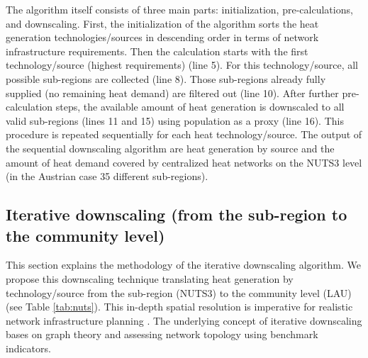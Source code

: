\newpage
The algorithm itself consists of three main parts: initialization, pre-calculations, and downscaling. First, the initialization of the algorithm sorts the heat generation technologies/sources in descending order in terms of network infrastructure requirements. Then the calculation starts with the first technology/source (highest requirements) (line 5). For this technology/source, all possible sub-regions are collected (line 8). Those sub-regions already fully supplied (no remaining heat demand) are filtered out (line 10). After further pre-calculation steps, the available amount of heat generation is downscaled to all valid sub-regions (lines 11 and 15) using population as a proxy (line 16). This procedure is repeated sequentially for each heat technology/source. The output of the sequential downscaling algorithm are heat generation by source and the amount of heat demand covered by centralized heat networks on the NUTS3 level (in the Austrian case 35 different sub-regions). 

\subsection{Iterative downscaling (from the sub-region to the community level)}\label{alg2}
This section explains the methodology of the iterative downscaling algorithm. We propose this downscaling technique translating heat generation by technology/source from the sub-region (NUTS3) to the community level (LAU) (see Table \ref{tab:nuts}). This in-depth spatial resolution is imperative for realistic network infrastructure planning \cite{zvoleff2009impact}. The underlying concept of iterative downscaling bases on graph theory and assessing network topology using benchmark indicators. 

